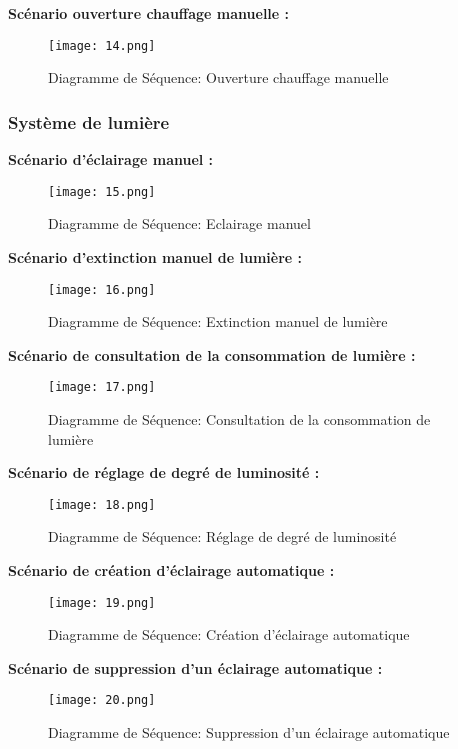 \begin{spacing}{1.2}
\textbf{Scénario ouverture chauffage manuelle :}
\begin{figure}[H]\centering
\texttt{[image: 14.png]}
\caption{Diagramme de Séquence: Ouverture chauffage manuelle}
\label{fig:fig3}
\end{figure}

\newpage

\subsubsection{Système de lumière}

\textbf{Scénario d’éclairage manuel :}
\begin{figure}[H]\centering
\texttt{[image: 15.png]}
\caption{Diagramme de Séquence: Eclairage manuel}
\label{fig:fig3}
\end{figure}

\newpage

\textbf{Scénario d’extinction manuel de lumière :}
\begin{figure}[H]\centering
\texttt{[image: 16.png]}
\caption{Diagramme de Séquence: Extinction manuel de lumière}
\label{fig:fig3}
\end{figure}

\newpage

\textbf{Scénario de consultation de la consommation de lumière :}
\begin{figure}[H]\centering
\texttt{[image: 17.png]}
\caption{Diagramme de Séquence: Consultation de la consommation de lumière}
\label{fig:fig3}
\end{figure}
 
 
 \textbf{Scénario de réglage de degré de luminosité :}
\begin{figure}[H]\centering
\texttt{[image: 18.png]}
\caption{Diagramme de Séquence: Réglage de degré de luminosité}
\label{fig:fig3}
\end{figure}

\newpage
 
 \textbf{Scénario de création d’éclairage automatique :}
\begin{figure}[H]\centering
\texttt{[image: 19.png]}
\caption{Diagramme de Séquence: Création d’éclairage automatique}
\label{fig:fig3}
\end{figure}

\newpage
 
 \textbf{Scénario de suppression d’un éclairage automatique :}
\begin{figure}[H]\centering
\texttt{[image: 20.png]}
\caption{Diagramme de Séquence: Suppression d’un éclairage automatique}
\label{fig:fig3}
\end{figure}
 

\end{spacing}
